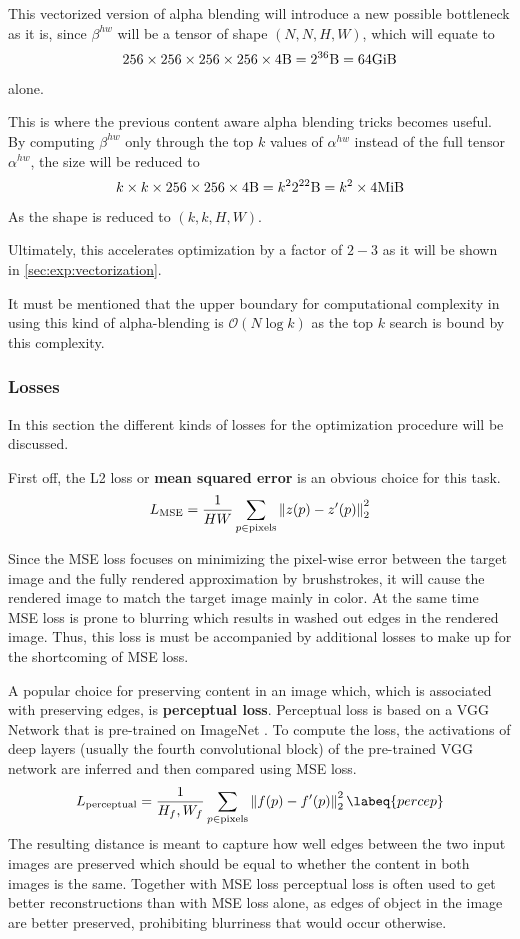 This vectorized version of alpha blending will introduce a new possible bottleneck as it is, since $\beta^{hw}$ will be a tensor of shape $(N, N, H, W)$, which will equate to
$$
256 \times 256 \times 256 \times 256 \times 4 \si{\byte} = 2^{36}\si{\byte} = 64\si{\gibi\byte}
$$
alone.

This is where the previous content aware alpha blending tricks becomes useful.
By computing $\beta^{hw}$ only through the top $k$ values of $\alpha^{hw}$ instead of the full tensor $\alpha^{hw}$, the size will be reduced to
$$
k \times k \times 256 \times 256 \times 4 \si{\byte} = k^2 2^{22}\si{\byte} = k^2 \times 4\si{\mebi\byte}
$$
As the shape is reduced to $(k, k, H, W)$.

Ultimately, this accelerates optimization by a factor of $2-3$ as it will be shown in \ref{sec:exp:vectorization}.

It must be mentioned that the upper boundary for computational complexity in using this kind of alpha-blending is $\mathcal{O}(N \log k)$ as the top $k$ search is bound by this complexity.

\subsubsection{Losses}

In this section the different kinds of losses for the optimization procedure will be discussed.

First off, the L2 loss or \textbf{mean squared error} is an obvious choice for this task.
\begin{align}
    L_{\text{MSE}} = \frac{1}{HW} \sum_{p \in \text{pixels}} \left\lVert z(p) - z'(p)\right\rVert_2^2
\end{align}

Since the MSE loss focuses on minimizing the pixel-wise error between the target image and the fully rendered approximation by brushstrokes, it will cause the rendered image to match the target image mainly in color.
At the same time MSE loss is prone to blurring which results in washed out edges in the rendered image.
Thus, this loss is must be accompanied by additional losses to make up for the shortcoming of MSE loss.

A popular choice for preserving content in an image which, which is associated with preserving edges, is \textbf{perceptual loss}.
Perceptual loss is based on a VGG Network \cite{VGG} that is pre-trained on ImageNet \cite{ImageNet}.
To compute the loss, the activations of deep layers (usually the fourth convolutional block) of the pre-trained VGG network are inferred and then compared using MSE loss.
\begin{align}
    L_{\text{perceptual}} = \frac{1}{H_f, W_f} \sum_{p \in \text{pixels}} \norm{f(p) - f'(p)}_2^2
    \labeq{percep}
\end{align}
The resulting distance is meant to capture how well edges between the two input images are preserved which should be equal to whether the content in both images is the same.
Together with MSE loss perceptual loss is often used to get better reconstructions than with MSE loss alone, as edges of object in the image are better preserved, prohibiting blurriness that would occur otherwise.

